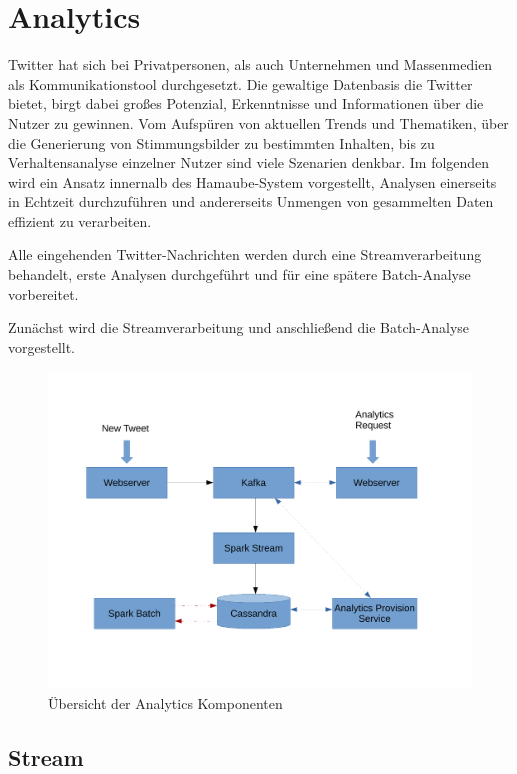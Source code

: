 

\chapter{Analytics}
\label{Analytics}

Twitter hat sich bei Privatpersonen, als auch Unternehmen und Massenmedien als Kommunikationstool durchgesetzt.
Die gewaltige Datenbasis die Twitter bietet, birgt dabei großes Potenzial, Erkenntnisse und Informationen über die Nutzer zu gewinnen.
Vom Aufspüren von aktuellen Trends und Thematiken, über die Generierung von Stimmungsbilder zu bestimmten Inhalten, bis zu Verhaltensanalyse einzelner Nutzer sind viele Szenarien denkbar.
Im folgenden wird ein Ansatz innernalb des Hamaube-System vorgestellt, Analysen einerseits in Echtzeit durchzuführen und andererseits Unmengen von gesammelten Daten effizient zu verarbeiten.

Alle eingehenden Twitter-Nachrichten werden durch eine Streamverarbeitung behandelt, erste Analysen durchgeführt und für eine spätere Batch-Analyse vorbereitet.

Zunächst wird die Streamverarbeitung und anschließend die Batch-Analyse vorgestellt.

\begin{figure}[htbp!]
	\centering
	\includegraphics[width=\textwidth]{pics/analytics/archi}
	\caption{Übersicht der Analytics Komponenten}
\end{figure}

\section{Stream}

